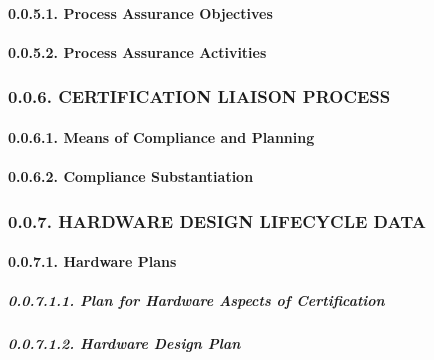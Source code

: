 \documentclass[
]{article}
\begin{document}
\hypertarget{process-assurance-objectives}{%
\paragraph{0.0.5.1. Process Assurance
Objectives}\label{process-assurance-objectives}}

\hypertarget{process-assurance-activities}{%
\paragraph{0.0.5.2. Process Assurance
Activities}\label{process-assurance-activities}}

\hypertarget{certification-liaison-process}{%
\subsubsection{0.0.6. CERTIFICATION LIAISON
PROCESS}\label{certification-liaison-process}}

\hypertarget{means-of-compliance-and-planning}{%
\paragraph{0.0.6.1. Means of Compliance and
Planning}\label{means-of-compliance-and-planning}}

\hypertarget{compliance-substantiation}{%
\paragraph{0.0.6.2. Compliance
Substantiation}\label{compliance-substantiation}}

\hypertarget{hardware-design-lifecycle-data}{%
\subsubsection{0.0.7. HARDWARE DESIGN LIFECYCLE
DATA}\label{hardware-design-lifecycle-data}}

\hypertarget{hardware-plans}{%
\paragraph{0.0.7.1. Hardware Plans}\label{hardware-plans}}

\hypertarget{plan-for-hardware-aspects-of-certification}{%
\subparagraph{0.0.7.1.1. Plan for Hardware Aspects of
Certification}\label{plan-for-hardware-aspects-of-certification}}

\hypertarget{hardware-design-plan}{%
\subparagraph{0.0.7.1.2. Hardware Design
Plan}\label{hardware-design-plan}}
\end{document}
